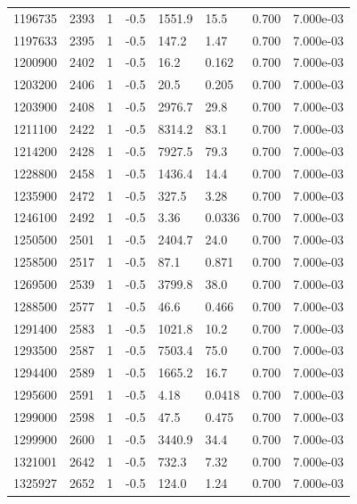 \documentclass[preview]{standalone}
\begin{document}
{{{{{{{{\begin{tabular}{L{1.2cm}C{1.2cm} C{0.3cm}C{0.5cm} C{1.4cm}C{1.4cm} C{1.4cm}C{1.4cm}}
  1196735  &  2393  & 1     & -0.5 &  1551.9  & 15.5  & 0.700 &  7.000e-03   \\ 
  1197633  &  2395  & 1     & -0.5 &  147.2  & 1.47  & 0.700 &  7.000e-03   \\ 
  1200900  &  2402  & 1     & -0.5 &  16.2  & 0.162  & 0.700 &  7.000e-03   \\ 
  1203200  &  2406  & 1     & -0.5 &  20.5  & 0.205  & 0.700 &  7.000e-03   \\ 
  1203900  &  2408  & 1     & -0.5 &  2976.7  & 29.8  & 0.700 &  7.000e-03   \\ 
  1211100  &  2422  & 1     & -0.5 &  8314.2  & 83.1  & 0.700 &  7.000e-03   \\ 
  1214200  &  2428  & 1     & -0.5 &  7927.5  & 79.3  & 0.700 &  7.000e-03   \\ 
  1228800  &  2458  & 1     & -0.5 &  1436.4  & 14.4  & 0.700 &  7.000e-03   \\ 
  1235900  &  2472  & 1     & -0.5 &  327.5  & 3.28  & 0.700 &  7.000e-03   \\ 
  1246100  &  2492  & 1     & -0.5 &  3.36  & 0.0336  & 0.700 &  7.000e-03   \\ 
  1250500  &  2501  & 1     & -0.5 &  2404.7  & 24.0  & 0.700 &  7.000e-03   \\ 
  1258500  &  2517  & 1     & -0.5 &  87.1  & 0.871  & 0.700 &  7.000e-03   \\ 
  1269500  &  2539  & 1     & -0.5 &  3799.8  & 38.0  & 0.700 &  7.000e-03   \\ 
  1288500  &  2577  & 1     & -0.5 &  46.6  & 0.466  & 0.700 &  7.000e-03   \\ 
  1291400  &  2583  & 1     & -0.5 &  1021.8  & 10.2  & 0.700 &  7.000e-03   \\ 
  1293500  &  2587  & 1     & -0.5 &  7503.4  & 75.0  & 0.700 &  7.000e-03   \\ 
  1294400  &  2589  & 1     & -0.5 &  1665.2  & 16.7  & 0.700 &  7.000e-03   \\ 
  1295600  &  2591  & 1     & -0.5 &  4.18  & 0.0418  & 0.700 &  7.000e-03   \\ 
  1299000  &  2598  & 1     & -0.5 &  47.5  & 0.475  & 0.700 &  7.000e-03   \\ 
  1299900  &  2600  & 1     & -0.5 &  3440.9  & 34.4  & 0.700 &  7.000e-03   \\ 
  1321001  &  2642  & 1     & -0.5 &  732.3  & 7.32  & 0.700 &  7.000e-03   \\ 
  1325927  &  2652  & 1     & -0.5 &  124.0  & 1.24  & 0.700 &  7.000e-03   \\ 

\end{tabular}}}}}}}}}
\end{document}
